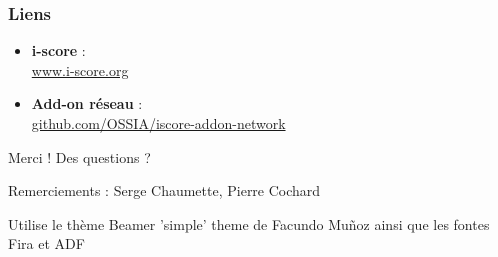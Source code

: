 \documentclass[]{beamer}
\begin{document}
\begin{frame}
    \frametitle{Liens} 
    \Large
    \begin{itemize}
        \setlength\itemsep{1em}
        \item \textbf{i-score} :~\\ {\small \url{www.i-score.org} }
        \item \textbf{Add-on réseau} :~\\ {\small \url{github.com/OSSIA/iscore-addon-network} }
    \end{itemize}
        
    \centering
    \vspace{2em}
    \Large{Merci ! Des questions ?}
    \vspace{2em}
    
    \small{Remerciements : Serge Chaumette, Pierre Cochard}
    
    \vspace{1em}
    
    \tiny{Utilise le thème Beamer 'simple' theme de Facundo Muñoz ainsi que les fontes Fira et ADF}
\end{frame}
\end{document}
